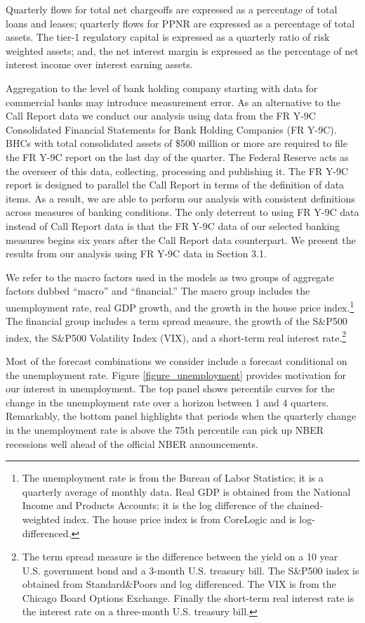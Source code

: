 \documentclass[12pt]{article}
\begin{document}
Quarterly flows for total net chargeoffs are expressed as a
percentage of total loans and leases; quarterly flows for PPNR are
expressed as a percentage of total assets. The tier-1 regulatory
capital is expressed as a quarterly ratio of risk weighted assets;
and, the net interest margin is expressed as the percentage of net
interest income over interest earning assets.

Aggregation to the level of bank holding company starting with
data for commercial banks may introduce measurement error. As an
alternative to the Call Report data we conduct our analysis using
data from the FR Y-9C Consolidated Financial Statements for Bank
Holding Companies (FR Y-9C). BHCs with total consolidated assets
of \$500 million or more are required to file the FR Y-9C report
on the last day of the quarter. The Federal Reserve acts as the
overseer of this data, collecting, processing and publishing it.
The FR Y-9C report is designed to parallel the Call Report in
terms of the definition of data items. As a result, we are able to
perform our analysis with consistent definitions across measures
of banking conditions. The only deterrent to using FR Y-9C data
instead of Call Report data is that the FR Y-9C data of our
selected banking measures begins six years after the Call Report
data counterpart. We present the results from our analysis using
FR Y-9C data in Section 3.1.

We refer to the macro factors used in the models as two groups of
aggregate factors dubbed ``macro'' and ``financial.'' The macro
group includes the unemployment rate, real GDP growth, and the
growth in the house price index.\footnote{The unemployment rate is
from the Bureau of Labor Statistics; it is a quarterly average of
monthly data. Real GDP is obtained from the National Income and
Products Accounts; it is the log difference of the
chained-weighted index. The house price index is from CoreLogic
and is log-differenced.} The financial group includes a term
spread measure, the growth of the S\&P500 index, the S\&P500
Volatility Index (VIX), and a short-term real interest
rate.\footnote{The term spread measure is the difference between
the yield on a 10 year U.S. government bond and a 3-month U.S.
treasury bill. The S\&P500 index is obtained from Standard\&Poors
and log differenced. The VIX is from the Chicago Board Options
Exchange. Finally the short-term real interest rate is the
interest rate on a three-month U.S. treasury bill.}

Most of the forecast combinations we consider include a forecast
conditional on the unemployment rate. Figure
\ref{figure_unemployment} provides motivation for our interest in
unemployment. The top panel shows percentile curves for the change
in the unemployment rate over a horizon between 1 and 4 quarters.
Remarkably, the bottom panel highlights that periods when the
quarterly change in the unemployment rate is above the 75th
percentile can pick up NBER recessions well ahead of the official
NBER announcements.
\end{document}
